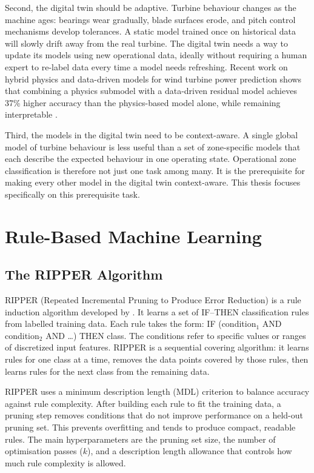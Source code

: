 Second, the digital twin should be adaptive. Turbine behaviour changes as the machine
ages: bearings wear gradually, blade surfaces erode, and pitch control mechanisms
develop tolerances. A static model trained once on historical data will slowly drift away
from the real turbine. The digital twin needs a way to update its models using new
operational data, ideally without requiring a human expert to re-label data every time a
model needs refreshing. Recent work on hybrid physics and data-driven models for wind
turbine power prediction shows that combining a physics submodel with a data-driven
residual model achieves 37\% higher accuracy than the physics-based model alone, while
remaining interpretable \citep{gijon2025}.

Third, the models in the digital twin need to be context-aware. A single global model of
turbine behaviour is less useful than a set of zone-specific models that each describe
the expected behaviour in one operating state. Operational zone classification is
therefore not just one task among many. It is the prerequisite for making every other
model in the digital twin context-aware. This thesis focuses specifically on this
prerequisite task.

\section{Rule-Based Machine Learning}
\label{sec:bg:rules}

\subsection{The RIPPER Algorithm}
\label{subsec:bg:ripper}

RIPPER (Repeated Incremental Pruning to Produce Error Reduction) is a rule induction
algorithm developed by \citet{cohen1995}. It learns a set of IF--THEN classification
rules from labelled training data. Each rule takes the form: IF (condition$_1$ AND
condition$_2$ AND \ldots) THEN class. The conditions refer to specific values or ranges
of discretized input features. RIPPER is a sequential covering algorithm: it learns rules
for one class at a time, removes the data points covered by those rules, then learns
rules for the next class from the remaining data.

RIPPER uses a minimum description length (MDL) criterion to balance accuracy against rule
complexity. After building each rule to fit the training data, a pruning step removes
conditions that do not improve performance on a held-out pruning set. This prevents
overfitting and tends to produce compact, readable rules. The main hyperparameters are
the pruning set size, the number of optimisation passes ($k$), and a description length
allowance that controls how much rule complexity is allowed.

